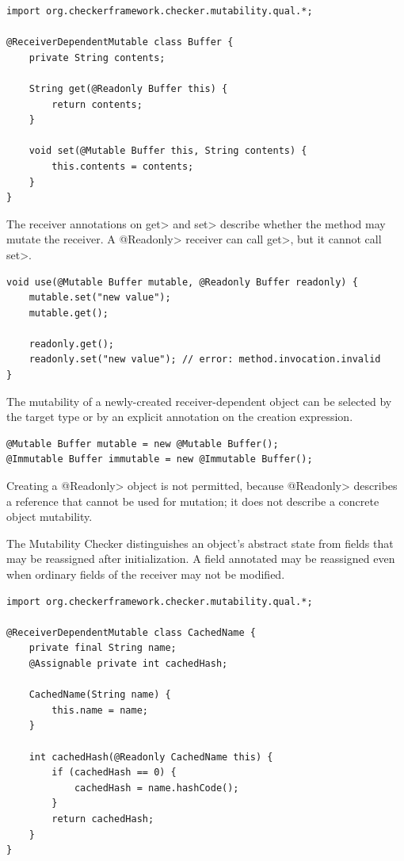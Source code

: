 \begin{Verbatim}
import org.checkerframework.checker.mutability.qual.*;

@ReceiverDependentMutable class Buffer {
    private String contents;

    String get(@Readonly Buffer this) {
        return contents;
    }

    void set(@Mutable Buffer this, String contents) {
        this.contents = contents;
    }
}
\end{Verbatim}

The receiver annotations on \<get> and \<set> describe whether the method
may mutate the receiver.  A \<@Readonly> receiver can call \<get>, but it
cannot call \<set>.

\begin{Verbatim}
void use(@Mutable Buffer mutable, @Readonly Buffer readonly) {
    mutable.set("new value");
    mutable.get();

    readonly.get();
    readonly.set("new value"); // error: method.invocation.invalid
}
\end{Verbatim}


The mutability of a newly-created receiver-dependent object can be selected
by the target type or by an explicit annotation on the creation expression.

\begin{Verbatim}
@Mutable Buffer mutable = new @Mutable Buffer();
@Immutable Buffer immutable = new @Immutable Buffer();
\end{Verbatim}

Creating a \<@Readonly> object is not permitted, because \<@Readonly>
describes a reference that cannot be used for mutation; it does not describe
a concrete object mutability.


The Mutability Checker distinguishes an object's abstract state from fields that may be
reassigned after initialization.  A field annotated
 may be reassigned even when
ordinary fields of the receiver may not be modified.

\begin{Verbatim}
import org.checkerframework.checker.mutability.qual.*;

@ReceiverDependentMutable class CachedName {
    private final String name;
    @Assignable private int cachedHash;

    CachedName(String name) {
        this.name = name;
    }

    int cachedHash(@Readonly CachedName this) {
        if (cachedHash == 0) {
            cachedHash = name.hashCode();
        }
        return cachedHash;
    }
}
\end{Verbatim}

